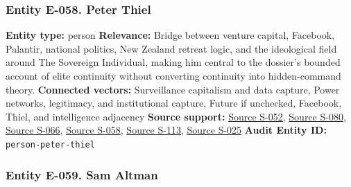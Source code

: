 \documentclass[
  american,
  11pt,
  letterpaper,
]{article}
\begin{document}
\subsubsection{Entity E-058. Peter
Thiel}\label{entity-e-058-peter-thiel}

\textbf{Entity type:} person \textbf{Relevance:} Bridge between venture
capital, Facebook, Palantir, national politics, New Zealand retreat
logic, and the ideological field around The Sovereign Individual, making
him central to the dossier's bounded account of elite continuity without
converting continuity into hidden-command theory. \textbf{Connected
vectors:} Surveillance capitalism and data capture, Power networks,
legitimacy, and institutional capture, Future if unchecked, Facebook,
Thiel, and intelligence adjacency \textbf{Source support:}
\hyperref[source-s-052-facebook-inc-registration-statement-on-form-s-1]{Source
S-052},
\hyperref[source-s-080-meta-platforms-inc-2022-definitive-proxy-statement]{Source
S-080},
\hyperref[source-s-066-why-silicon-valley-billionaires-are-prepping-for-the-apocalypse-in-new-zealand]{Source
S-066},
\hyperref[source-s-058-new-zealand-woos-the-wealthy-with-golden-visa-changes]{Source
S-058},
\hyperref[source-s-113-the-sovereign-individual-official-publisher-page]{Source
S-113},
\hyperref[source-s-025-thiel-brings-his-antichrist-lectures-to-the-vaticans-doorstep-and-catholic-institutions-back-away]{Source
S-025} \textbf{Audit Entity ID:} \texttt{person-peter-thiel}

\subsubsection{Entity E-059. Sam Altman}\label{entity-e-059-sam-altman}
\end{document}

